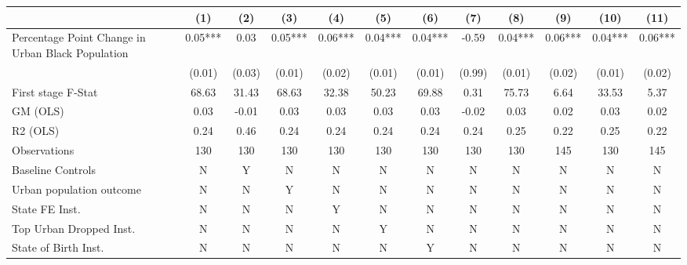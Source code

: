  \begin{tabular}{l*{11}{c}} \toprule
                    &\multicolumn{1}{c}{(1)}   &\multicolumn{1}{c}{(2)}   &\multicolumn{1}{c}{(3)}   &\multicolumn{1}{c}{(4)}   &\multicolumn{1}{c}{(5)}   &\multicolumn{1}{c}{(6)}   &\multicolumn{1}{c}{(7)}   &\multicolumn{1}{c}{(8)}   &\multicolumn{1}{c}{(9)}   &\multicolumn{1}{c}{(10)}   &\multicolumn{1}{c}{(11)}   \\
\midrule
Percentage Point Change in Urban Black Population&     0.05***&     0.03   &     0.05***&     0.06***&     0.04***&     0.04***&    -0.59   &     0.04***&     0.06***&     0.04***&     0.06***\\
                    &   (0.01)   &   (0.03)   &   (0.01)   &   (0.02)   &   (0.01)   &   (0.01)   &   (0.99)   &   (0.01)   &   (0.02)   &   (0.01)   &   (0.02)   \\
\midrule
First stage F-Stat  &    68.63   &    31.43   &    68.63   &    32.38   &    50.23   &    69.88   &     0.31   &    75.73   &     6.64   &    33.53   &     5.37   \\
GM (OLS)            &     0.03   &    -0.01   &     0.03   &     0.03   &     0.03   &     0.03   &    -0.02   &     0.03   &     0.02   &     0.03   &     0.02   \\
R2 (OLS)            &     0.24   &     0.46   &     0.24   &     0.24   &     0.24   &     0.24   &     0.24   &     0.25   &     0.22   &     0.25   &     0.22   \\
Observations        &      130   &      130   &      130   &      130   &      130   &      130   &      130   &      130   &      145   &      130   &      145   \\
Baseline Controls   &        N   &        Y   &        N   &        N   &        N   &        N   &        N   &        N   &        N   &        N   &        N   \\
Urban population outcome&        N   &        N   &        Y   &        N   &        N   &        N   &        N   &        N   &        N   &        N   &        N   \\
State FE Inst.      &        N   &        N   &        N   &        Y   &        N   &        N   &        N   &        N   &        N   &        N   &        N   \\
Top Urban Dropped Inst.&        N   &        N   &        N   &        N   &        Y   &        N   &        N   &        N   &        N   &        N   &        N   \\
State of Birth Inst.&        N   &        N   &        N   &        N   &        N   &        Y   &        N   &        N   &        N   &        N   &        N   \\

\end{tabular}

